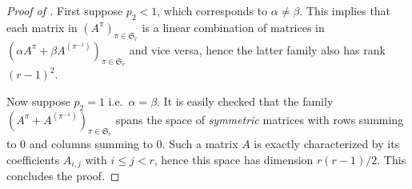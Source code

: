 \documentclass{article}
\theoremstyle{remark}
\def\S{\mathfrak{S}}
\begin{document}
\begin{proof}[Proof of ]
    First suppose $p_2<1$, which corresponds to $\alpha\ne\beta$.
    This implies that each matrix in $(A^\pi)_{\pi\in\S_r}$ is a linear combination of matrices in $\left(\alpha A^\pi + \beta A^{(\pi^{-1})}\right)_{\pi\in\S_r}$ and vice versa, hence the latter family also has rank $(r-1)^2$.

    Now suppose $p_2=1$ i.e.~$\alpha=\beta$.
    It is easily checked that the family $\left(A^\pi + A^{(\pi^{-1})}\right)_{\pi\in\S_r}$ spans the space of {\em symmetric} matrices with rows summing to 0 and columns summing to 0.
    Such a matrix $A$ is exactly characterized by its coefficients $A_{i,j}$ with $i\le j<r$, hence this space has dimension $r(r-1)/2$.
    This concludes the proof.
\end{proof}





\end{document}
